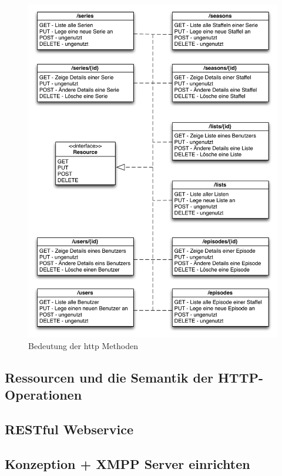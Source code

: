 \documentclass[a4paper]{article}
\begin{document}
\begin{figure}[H]
\includegraphics[width=1\textwidth]{images/bedeutunghttpmethoden.png}
\caption{Bedeutung der http Methoden}
\label{bedeutunghttpmethoden}
\end{figure}

\newpage

\subsection{Ressourcen und die Semantik der HTTP-Operationen}

\newpage

\subsection{RESTful Webservice}

\newpage

\subsection{Konzeption + XMPP Server einrichten}
\end{document}
